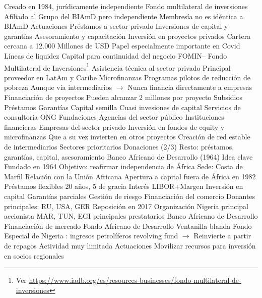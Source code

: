 \documentclass{nuevotema}
\begin{document}
\begin{esquemal}
				\4 Creado en 1984, jurídicamente independiente
				\4 Fondo multilateral de inversiones
				\4 Afiliado al Grupo del BIAmD pero independiente
				\4 Membresía no es idéntica a BIAmD
				\4 Actuaciones
				\4[] Préstamos a sector privado
				\4[] Inversiones de capital y garantías
				\4[] Asesoramiento y capacitación
				\4[] Inversión en proyectos privados
				\4 Cartera cercana a 12.000 Millones de USD
				\4 Papel especialmente importante en Covid
				\4[] Líneas de liquidez
				\4[] Capital para continuidad del negocio
			\3 FOMIN-- Fondo Multilateral de Inversiones\footnote{Ver \url{https://www.iadb.org/es/resources-businesses/fondo-multilateral-de-inversiones}}
				\4 Asistencia técnica al sector privado
				\4[] Principal proveedor en LatAm y Caribe
				\4 Microfinanzas
				\4[] Programas pilotos de reducción de pobreza
				\4[] Aunque vía intermediarios
				\4[] $\to$ Nunca financia directamente a empresas
				\4 Financiación de proyectos
				\4[] Pueden alcanzar 2 millones por proyecto
				\4[] Subsidios
				\4[] Préstamos
				\4[] Garantías
				\4[] Capital semilla
				\4[] Cuasi invesiones de capital
				\4 Servicios de consultoría
				\4[] ONG
				\4[] Fundaciones
				\4[] Agencias del sector público
				\4[] Instituciones financieras
				\4[] Empresas del sector privado
				\4 Inversión en fondos de equity y microfinanzas
				\4[] Que a su vez invierten en otros proyectos
				\4[] Creación de red estable de intermediarios
				\4 Sectores prioritarios
				\4 Donaciones (2/3)
				\4 Resto: préstamos, garantías, capital, asesoramiento
		\2 Banco Africano de Desarrollo (1964)
			\3 Idea clave
				\4 Fundado en 1964
				\4 Objetivo:
				\4[] reafirmar independencia de África
				\4 Sede:
				\4[] Costa de Marfil
				\4 Relación con la Unión Africana
				\4 Apertura a capital fuera de África en 1982
				\4 Préstamos flexibles 20 años, 5 de gracia
				\4 Interés LIBOR+Margen
				\4 Inversión en capital
				\4 Garantías parciales
				\4 Gestión de riesgo
				\4 Financiación del comercio
				\4 Donantes principales: RU, USA, GER
				\4 Reposición en 2017
			\3 Organización
				\4 Nigeria principal accionista
				\4 MAR, TUN, EGI principales prestatarios
				\4 Banco Africano de Desarrollo
				\4[] Financiación de mercado
				\4 Fondo Africano de Desarrollo
				\4[] Ventanilla blanda
				\4 Fondo Especial de Nigeria
				: ingresos petrolíferos
				\4[] revolving fund
				\4[] $\to$ Reinvierte a partir de repagos
				\4[] Actividad muy limitada
			\3 Actuaciones
				\4 Movilizar recursos para inversión en socios regionales

\end{esquemal}
\end{document}
